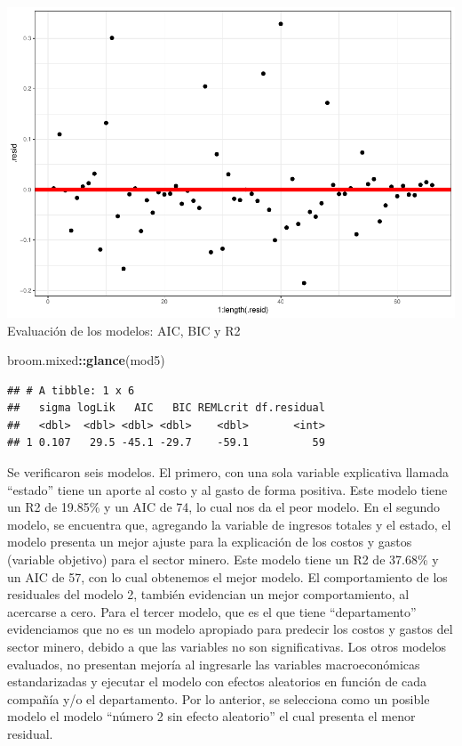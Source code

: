 \documentclass[
  11pt,
  a4paper,
]{book}
\newenvironment{Shaded}{\begin{snugshade}}{\end{snugshade}}
\newcommand{\KeywordTok}[1]{\textcolor[rgb]{0.13,0.29,0.53}{\textbf{#1}}}
\newcommand{\NormalTok}[1]{#1}
\newcommand{\OperatorTok}[1]{\textcolor[rgb]{0.81,0.36,0.00}{\textbf{#1}}}
\begin{document}
\includegraphics{index_files/figure-latex/unnamed-chunk-27-1.pdf}
Evaluación de los modelos: AIC, BIC y R2

\begin{Shaded}
\begin{Highlighting}[]
\NormalTok{broom.mixed}\OperatorTok{::}\KeywordTok{glance}\NormalTok{(mod5)}
\end{Highlighting}
\end{Shaded}

\begin{verbatim}
## # A tibble: 1 x 6
##   sigma logLik   AIC   BIC REMLcrit df.residual
##   <dbl>  <dbl> <dbl> <dbl>    <dbl>       <int>
## 1 0.107   29.5 -45.1 -29.7    -59.1          59
\end{verbatim}

Se verificaron seis modelos. El primero, con una sola variable
explicativa llamada ``estado'' tiene un aporte al costo y al gasto de
forma positiva. Este modelo tiene un R2 de 19.85\% y un AIC de 74, lo
cual nos da el peor modelo. En el segundo modelo, se encuentra que,
agregando la variable de ingresos totales y el estado, el modelo
presenta un mejor ajuste para la explicación de los costos y gastos
(variable objetivo) para el sector minero. Este modelo tiene un R2 de
37.68\% y un AIC de 57, con lo cual obtenemos el mejor modelo. El
comportamiento de los residuales del modelo 2, también evidencian un
mejor comportamiento, al acercarse a cero. Para el tercer modelo, que es
el que tiene ``departamento'' evidenciamos que no es un modelo apropiado
para predecir los costos y gastos del sector minero, debido a que las
variables no son significativas. Los otros modelos evaluados, no
presentan mejoría al ingresarle las variables macroeconómicas
estandarizadas y ejecutar el modelo con efectos aleatorios en función de
cada compañía y/o el departamento. Por lo anterior, se selecciona como
un posible modelo el modelo ``número 2 sin efecto aleatorio'' el cual
presenta el menor residual.
\end{document}
